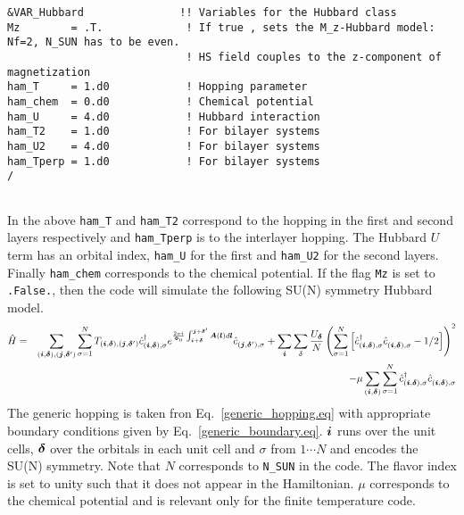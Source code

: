 \begin{lstlisting}[style=fortran,escapechar=\#,breaklines=true]
&VAR_Hubbard               !! Variables for the Hubbard class
Mz        = .T.             ! If true , sets the M_z-Hubbard model: Nf=2, N_SUN has to be even.  
                            ! HS field couples to the z-component of magnetization
ham_T     = 1.d0            ! Hopping parameter
ham_chem  = 0.d0            ! Chemical potential
ham_U     = 4.d0            ! Hubbard interaction
ham_T2    = 1.d0            ! For bilayer systems
ham_U2    = 4.d0            ! For bilayer systems
ham_Tperp = 1.d0            ! For bilayer systems
/
               
\end{lstlisting}
In the above   \texttt{ham\_T} and \texttt{ham\_T2}   correspond to the hopping in the first and second layers respectively and  \texttt{ham\_Tperp}   is to the interlayer hopping.   The Hubbard $U$ term has an orbital index, 
 \texttt{ham\_U}  for the first and  \texttt{ham\_U2}   for the second layers.  Finally   \texttt{ham\_chem}  corresponds to the chemical potential.     If  the flag \texttt{Mz} is set to \texttt{.False.},   then the code will simulate the  following 
SU(N)   symmetry Hubbard model. 
\begin{eqnarray}
\hat{H}= & & \sum_{(\ve{i},\ve{\delta}), (\ve{j},\ve{\delta}')}  \sum_{\sigma =1}^{N}  T_{(\ve{i},\ve{\delta}), (\ve{j},\ve{\delta}')}    \hat{c}^{\dagger}_{(\ve{i},\ve{\delta}), \sigma }   e^{\frac{2 \pi i}{\Phi_0} \int_{\ve{i} + \ve{\delta}}^{\ve{j} + \ve{\delta}'}  
     \vec{A}(\ve{l})  d \ve{l}} \hat{c}^{}_{(\ve{j},\ve{\delta}'),\sigma} 
+ \sum_{\vec{i}} \sum_{\delta}   \frac{U_{\ve{\delta}} }{N} \left(\sum_{\sigma=1}^{N}  \left[   \hat{c}^{\dagger}_{(\vec{i},\ve{\delta}),\sigma } 
    \hat{c}^{\phantom\dagger}_{(\vec{i}, \ve{\delta}),\sigma }  - 1/2  \right] \right)^2  \nonumber \\
    & & - \mu \sum_{(\ve{i},\ve{\delta})}  \sum_{\sigma =1}^{N} \hat{c}^{\dagger}_{(\vec{i},\ve{\delta}),\sigma } \hat{c}^{\phantom\dagger}_{(\vec{i},\ve{\delta}),\sigma } 
\end{eqnarray}
The  generic hopping is taken fron Eq.~\ref{generic_hopping.eq}   with appropriate boundary conditions given by Eq.~\ref{generic_boundary.eq}.    $\boldsymbol{i}$ runs over the unit cells, $\boldsymbol{\delta}$ over the orbitals in each unit cell and $\sigma$  from $1 \cdots N$  and encodes  the SU(N) symmetry.    Note that  $N$ corresponds to \texttt{N\_SUN}  in the code.  The flavor index is set to  unity such that it does not appear in the  Hamiltonian.  $\mu$ corresponds to the chemical potential  and is relevant only for the finite temperature code. 

